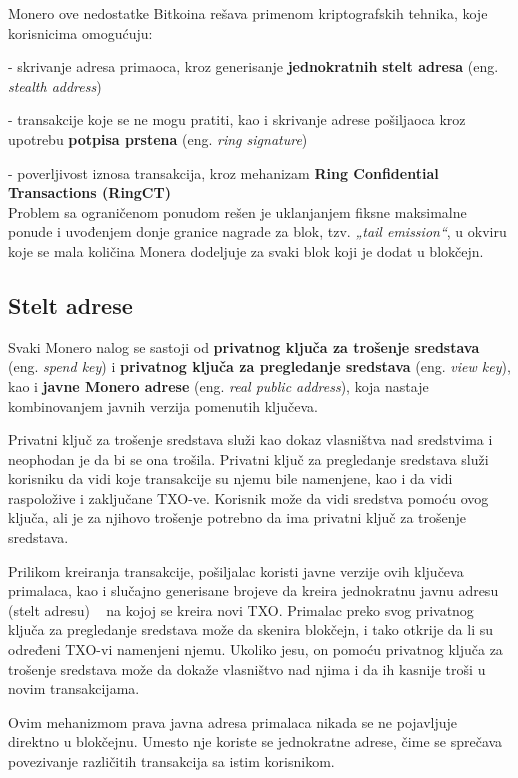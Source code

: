 \documentclass[12pt,a4paper]{article}
\begin{document}
Monero ove nedostatke Bitkoina rešava primenom kriptografskih tehnika, koje korisnicima omogućuju:

    -	skrivanje adresa primaoca, kroz generisanje \textbf{jednokratnih} \textbf{stelt adresa} (eng. \textit{stealth address})
    
    -	transakcije koje se ne mogu pratiti, kao i skrivanje adrese pošiljaoca kroz upotrebu \textbf{potpisa prstena} (eng. \textit{ring signature})
    
    -	poverljivost iznosa transakcija, kroz mehanizam \textbf{Ring Confidential Transactions (RingCT)}\\
    
Problem sa ograničenom ponudom rešen je uklanjanjem fiksne maksimalne ponude i uvođenjem donje granice nagrade za blok, tzv. \textit{„tail emission“}, u okviru koje se mala količina Monera dodeljuje za svaki blok koji je dodat u blokčejn.


\subsection{Stelt adrese}
Svaki Monero nalog se sastoji od \textbf{privatnog ključa za trošenje sredstava} (eng. \textit{spend key}) i \textbf{privatnog ključa za pregledanje sredstava} (eng. \textit{view key}), kao i \textbf{javne Monero adrese} (eng. \textit{real public address}), koja nastaje kombinovanjem javnih verzija pomenutih ključeva. 

Privatni ključ za trošenje sredstava služi kao dokaz vlasništva nad sredstvima i neophodan je da bi se ona trošila. Privatni ključ za pregledanje sredstava služi korisniku da vidi koje transakcije su njemu bile namenjene, kao i da vidi raspoložive i zaključane TXO-ve. Korisnik može da vidi sredstva pomoću ovog ključa, ali je za njihovo trošenje potrebno da ima privatni ključ za trošenje sredstava.

Prilikom kreiranja transakcije, pošiljalac koristi javne verzije ovih ključeva primalaca, kao i slučajno generisane brojeve da kreira jednokratnu javnu adresu (stelt adresu) ~\cite{mrl6} na kojoj se kreira novi TXO. Primalac preko svog privatnog ključa za pregledanje sredstava može da skenira blokčejn, i tako otkrije da li su određeni TXO-vi namenjeni njemu. Ukoliko jesu, on pomoću privatnog ključa za trošenje sredstava može da dokaže vlasništvo nad njima i da ih kasnije troši u novim transakcijama.

Ovim mehanizmom prava javna adresa primalaca nikada se ne pojavljuje direktno u blokčejnu. Umesto nje koriste se jednokratne adrese, čime se sprečava povezivanje različitih transakcija sa istim korisnikom.
\end{document}
